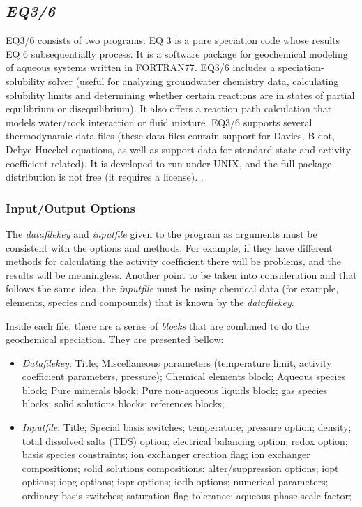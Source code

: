 \documentclass[ppgc,mestrado,english]{iiufrgs}
\begin{document}
\subsection{\emph{EQ3/6}}
EQ3/6 consists of two programs: EQ 3 is a pure speciation code whose results EQ 6 subsequentially process. It is a software package for geochemical modeling of aqueous systems written in FORTRAN77. EQ3/6 includes a speciation-solubility solver (useful for analyzing groundwater chemistry data, calculating solubility limits and determining whether certain reactions are in states of partial equilibrium or disequilibrium). It also offers a reaction path calculation that models water/rock interaction or fluid mixture. EQ3/6 supports several thermodynamic data files (these data files contain support for Davies, B-dot, Debye-Hueckel equations, as well as support data for standard state and activity coefficient-related). It is developed to run under UNIX, and the full package distribution is not free (it requires a license). \cite{Wolery:79} \cite{Wolery:90} \cite{Wolery:92}.

\subsubsection{Input/Output Options}
The \emph{datafilekey} and \emph{inputfile} given to the program as arguments must be consistent with the options and methods. For example, if they have different methods for calculating the activity coefficient there will be problems, and the results will be meaningless. Another point to be taken into consideration and that follows the same idea, the \emph{inputfile} must be using chemical data (for example, elements, species and compounds) that is known by the \emph{datafilekey}.

Inside each file, there are a series of \emph{blocks} that are combined to do the geochemical speciation. They are presented bellow:
\begin{itemize}
\item \emph{Datafilekey}: Title; Miscellaneous parameters (temperature limit, activity coefficient parameters, pressure); Chemical elements block; Aqueous species block; Pure minerals block; Pure non-aqueous liquids block; gas species blocks; solid solutions blocks; references blocks;
\item \emph{Inputfile}: Title; Special basis switches; temperature; pressure option; density; total dissolved salts (TDS) option; electrical balancing option; redox option; basis species constraints; ion exchanger creation flag; ion exchanger compositions; solid solutions compositions; alter/suppression options; iopt options; iopg options; iopr options; iodb options; numerical parameters; ordinary basis switches; saturation flag tolerance; aqueous phase scale factor;
\end{itemize}
\end{document}
